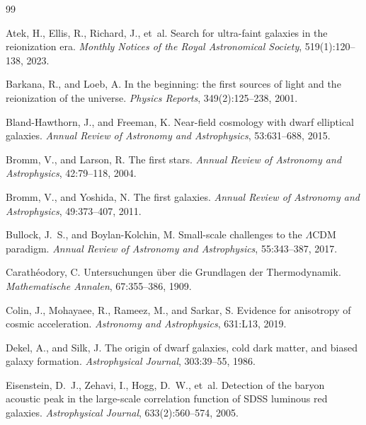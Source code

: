 \documentclass[12pt, a4paper]{article}
\theoremstyle{definition}
\begin{document}
\begin{thebibliography}{99}

Atek, H., Ellis, R., Richard, J., et~al.
\newblock Search for ultra-faint galaxies in the reionization era.
\newblock \textit{Monthly Notices of the Royal Astronomical Society}, 519(1):120--138, 2023.

Barkana, R., and Loeb, A.
\newblock In the beginning: the first sources of light and the reionization of the universe.
\newblock \textit{Physics Reports}, 349(2):125--238, 2001.

Bland-Hawthorn, J., and Freeman, K.
\newblock Near-field cosmology with dwarf elliptical galaxies.
\newblock \textit{Annual Review of Astronomy and Astrophysics}, 53:631--688, 2015.

Bromm, V., and Larson, R.
\newblock The first stars.
\newblock \textit{Annual Review of Astronomy and Astrophysics}, 42:79--118, 2004.

Bromm, V., and Yoshida, N.
\newblock The first galaxies.
\newblock \textit{Annual Review of Astronomy and Astrophysics}, 49:373--407, 2011.

Bullock, J.~S., and Boylan-Kolchin, M.
\newblock Small-scale challenges to the $\Lambda$CDM paradigm.
\newblock \textit{Annual Review of Astronomy and Astrophysics}, 55:343--387, 2017.

Carath\'{e}odory, C.
\newblock Untersuchungen \"{u}ber die Grundlagen der Thermodynamik.
\newblock \textit{Mathematische Annalen}, 67:355--386, 1909.

Colin, J., Mohayaee, R., Rameez, M., and Sarkar, S.
\newblock Evidence for anisotropy of cosmic acceleration.
\newblock \textit{Astronomy and Astrophysics}, 631:L13, 2019.

Dekel, A., and Silk, J.
\newblock The origin of dwarf galaxies, cold dark matter, and biased galaxy formation.
\newblock \textit{Astrophysical Journal}, 303:39--55, 1986.

Eisenstein, D.~J., Zehavi, I., Hogg, D.~W., et~al.
\newblock Detection of the baryon acoustic peak in the large-scale correlation function
  of SDSS luminous red galaxies.
\newblock \textit{Astrophysical Journal}, 633(2):560--574, 2005.


\end{thebibliography}
\end{document}
